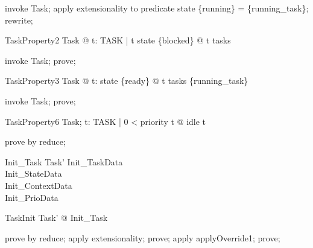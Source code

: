 \begin{zproof}[TaskProperty1]
invoke Task;
apply extensionality to predicate state \inv  \limg  \{running\} \rimg  = \{running\_task\};
rewrite;
\end{zproof}

\begin{theorem}{TaskProperty2}
\forall  Task @ \forall  t: TASK | t \in  state \inv  \limg  \{blocked\} \rimg  @ t \in  tasks
\end{theorem}

\begin{zproof}[TaskProperty2]
invoke Task;
prove;
\end{zproof}

\begin{theorem}{TaskProperty3}
\forall  Task @ \forall  t: state \inv  \limg  \{ready\} \rimg  @ t \in  tasks \setminus  \{running\_task\}
\end{theorem}

\begin{zproof}[TaskProperty3]
invoke Task;
prove;
\end{zproof}

\begin{theorem}{TaskProperty6}
\forall  Task; t: TASK | 0 < priority t @ idle \neq  t
\end{theorem}

\begin{zproof}[TaskProperty6]
prove by reduce;
\end{zproof}

\begin{schema}{Init\_Task} %
  Task'
\where
  Init\_TaskData\\
  Init\_StateData\\
  Init\_ContextData\\
  Init\_PrioData
\end{schema}

\begin{theorem}{TaskInit}
\exists  Task' @ Init\_Task
\end{theorem}

\begin{zproof}[TaskInit]
prove by reduce;
apply extensionality;
prove;
apply applyOverride1;
prove;
\end{zproof}

